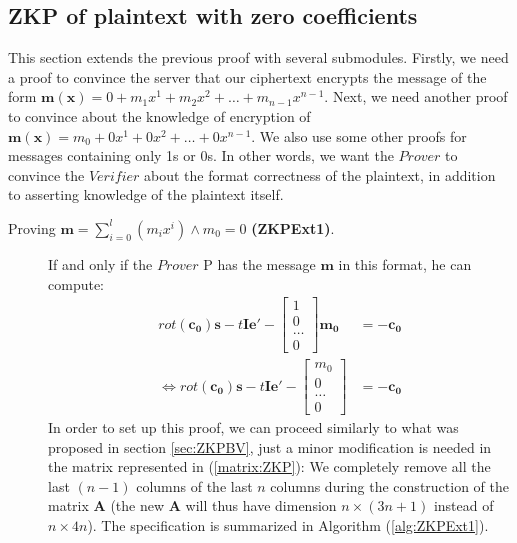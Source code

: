 \subsection{ZKP of plaintext with zero coefficients}
This section extends the previous proof with several submodules. Firstly, we
need a proof to convince the server that our ciphertext encrypts the message of the form $\mathbf{m(x)} =
0 + m_1x^1 + m_2x^2 + \dots + m_{n-1}x^{n-1}$. Next, we need another proof to convince about the knowledge of encryption of
$\mathbf{m(x)} = m_0 + 0x^1 + 0x^2 + \dots + 0x^{n-1}$. We also use some other proofs for messages containing only 1s or 0s. In other words, we want the $Prover$ to convince the $Verifier$
about the format correctness of the plaintext, in addition to asserting  knowledge of the plaintext itself.

\begin{description}
\item[Proving $\mathbf{m}=\sum_{i = 0}^l(m_ix^i) \land m_0 = 0$ \textbf{(ZKPExt1)}.]
  If and only if the $Prover$ P has the message $\mathbf{m}$ in this format, he can compute:
  \begin{align*}
    rot(\mathbf{c_0})\mathbf{s} -t\mathbf{Ie'} - \begin{bmatrix}
      1\\
      0\\
      \dots\\
      0
    \end{bmatrix}\mathbf{m_0} &= -\mathbf{c_0}\\
    \iff rot(\mathbf{c_0})\mathbf{s} -t\mathbf{Ie'} - \begin{bmatrix}
      m_0\\
      0\\
      \dots\\
      0
    \end{bmatrix} &= -\mathbf{c_0}
  \end{align*}
  In order to set up this proof, we can proceed similarly to what was proposed in section \ref{sec:ZKPBV},
  just a minor modification is needed in the matrix represented in (\ref{matrix:ZKP}):
  We completely remove all the last $(n-1)$ columns of the last $n$ columns during the construction of the matrix $\mathbf{A}$ (the new $\mathbf{A}$ will thus have dimension $n \times (3n + 1)$ instead of
  $n \times 4n$). The specification is summarized in Algorithm (\ref{alg:ZKPExt1}).


\end{description}
